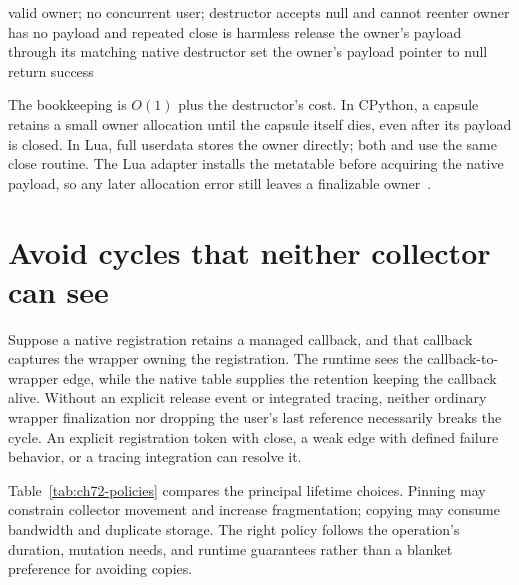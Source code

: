 \begin{algorithm}[htbp]
\caption{Close a serialized owner with a nonreentrant native destructor.}
\label{alg:ch72-close}
\begin{pseudocode}
\Require valid owner; no concurrent user; destructor accepts null and cannot reenter
\Ensure owner has no payload and repeated close is harmless
\State release the owner's payload through its matching native destructor
\State set the owner's payload pointer to null
\State return success
\end{pseudocode}
\end{algorithm}

The bookkeeping is $O(1)$ plus the destructor's cost.
In CPython, a capsule retains a small owner allocation until the capsule itself dies, even after its payload is closed.
In Lua, full userdata stores the owner directly; both  and  use the same close routine.
The Lua adapter installs the metatable before acquiring the native payload, so any later allocation error still leaves a finalizable owner~\cite{ierusalimschy-2026-lua}.

\section{Avoid cycles that neither collector can see}
\label{sec:ch72-cycles}
Suppose a native registration retains a managed callback, and that callback captures the wrapper owning the registration.
The runtime sees the callback-to-wrapper edge, while the native table supplies the retention keeping the callback alive.
Without an explicit release event or integrated tracing, neither ordinary wrapper finalization nor dropping the user's last reference necessarily breaks the cycle.
An explicit registration token with close, a weak edge with defined failure behavior, or a tracing integration can resolve it.

Table~\ref{tab:ch72-policies} compares the principal lifetime choices.
Pinning may constrain collector movement and increase fragmentation; copying may consume bandwidth and duplicate storage.
The right policy follows the operation's duration, mutation needs, and runtime guarantees rather than a blanket preference for avoiding copies.


